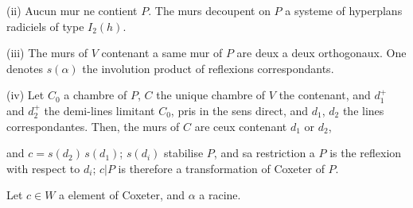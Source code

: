 \documentclass[11pt,a4paper]{article}
\theoremstyle{plain}
\theoremstyle{definition}
\begin{document}
\smallskip

\noindent
\textup{(ii)} Aucun mur ne contient $P$. The murs decoupent on $P$ a systeme of hyperplans radiciels of type $I_2(h)$.

\smallskip

\noindent
\textup{(iii)} The murs of $V$ contenant a same mur of $P$ are deux a deux orthogonaux. One denotes $s(\alpha)$ the involution product of reflexions correspondants.

\smallskip

\noindent
\textup{(iv)} Let $C_0$ a chambre of $P$, $C$ the unique chambre of $V$ the contenant, and $d_1^{+}$ and $d_2^{+}$ the demi-lines limitant $C_0$, pris in the sens direct, and $d_1$, $d_2$ the lines correspondantes. Then, the murs of $C$ are ceux contenant $d_1$ or $d_2$,

\newpage

\noindent
and $c = s(d_2)\, s(d_1)$; $s(d_i)$ stabilise $P$, and sa restriction a $P$ is the reflexion with respect to $d_i$; $c|P$ is therefore a transformation of Coxeter of $P$.

\bigskip

Let $c \in W$ a element of Coxeter, and $\alpha$ a racine.
\end{document}
